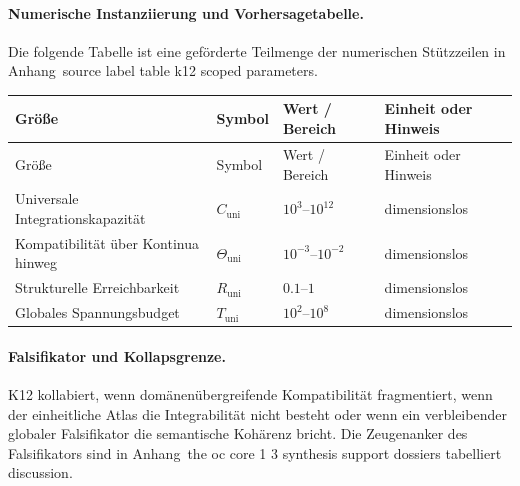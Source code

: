 \paragraph{Numerische Instanziierung und Vorhersagetabelle.}
Die folgende Tabelle ist eine geförderte Teilmenge der numerischen Stützzeilen in Anhang~source label table k12 scoped parameters.
\begin{longtable}{@{}L{0.27\textwidth}L{0.15\textwidth}L{0.24\textwidth}L{0.16\textwidth}@{}}
\toprule
Größe & Symbol & Wert / Bereich & Einheit oder Hinweis \\
\midrule
\endfirsthead
\toprule
Größe & Symbol & Wert / Bereich & Einheit oder Hinweis \\
\midrule
\endhead
Universale Integrationskapazität & $\scriptstyle C_{\mathrm{uni}}$ & $10^3\text{--}10^{12}$ & dimensionslos \\
Kompatibilität über Kontinua hinweg & $\scriptstyle \Theta_{\mathrm{uni}}$ & $10^{-3}\text{--}10^{-2}$ & dimensionslos \\
Strukturelle Erreichbarkeit & $\scriptstyle R_{\mathrm{uni}}$ & $0.1\text{--}1$ & dimensionslos \\
Globales Spannungsbudget & $\scriptstyle T_{\mathrm{uni}}$ & $10^2\text{--}10^8$ & dimensionslos \\
\bottomrule
\end{longtable}

\paragraph{Falsifikator und Kollapsgrenze.}
K12 kollabiert, wenn domänenübergreifende Kompatibilität fragmentiert, wenn der einheitliche Atlas die Integrabilität nicht besteht oder wenn ein verbleibender globaler Falsifikator die semantische Kohärenz bricht.
Die Zeugenanker des Falsifikators sind in Anhang~the oc core 1 3 synthesis support dossiers tabelliert discussion.

